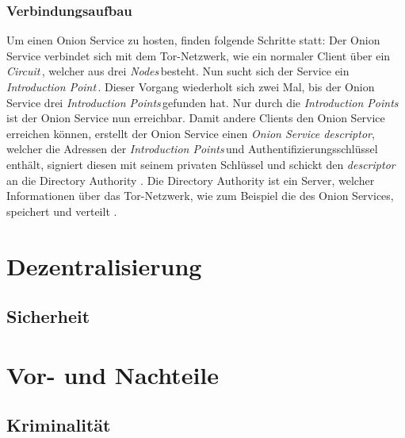 \documentclass[a4paper,ngerman, headheight=28pt,12pt]{scrartcl}
\newcommand{\vcite}[1]{\cite[vgl.][]{#1}}
\newcommand{\nodes}{\textit{Nodes\,}}
\newcommand{\circuit}{\textit{Circuit\,}}
\newcommand{\introp}{\textit{Introduction Point\,}}
\newcommand{\introps}{\textit{Introduction Points\,}}
\begin{document}
\subsubsection{Verbindungsaufbau}
Um einen Onion Service zu hosten, finden folgende Schritte statt:
Der Onion Service verbindet sich mit dem Tor-Netzwerk, wie ein normaler Client über ein \circuit, welcher aus drei \nodes besteht. Nun sucht sich der Service ein \introp. Dieser Vorgang wiederholt sich zwei Mal, bis der Onion Service drei \introps gefunden hat. Nur durch die \introps ist der Onion Service nun erreichbar. Damit andere Clients den Onion Service erreichen können, erstellt der Onion Service einen \textit{Onion Service descriptor}, welcher die Adressen der \introps und Authentifizierungsschlüssel enthält, signiert diesen mit seinem privaten Schlüssel und schickt den \textit{descriptor} an die Directory Authority \vcite{TorOnionService}. Die Directory Authority ist ein Server, welcher Informationen über das Tor-Netzwerk, wie zum Beispiel die des Onion Services, speichert und verteilt \vcite{TorDirectoryAuthority}.


\section{Dezentralisierung}
\subsection{Sicherheit}


\section{Vor- und Nachteile}
\subsection{Kriminalität}
\end{document}
